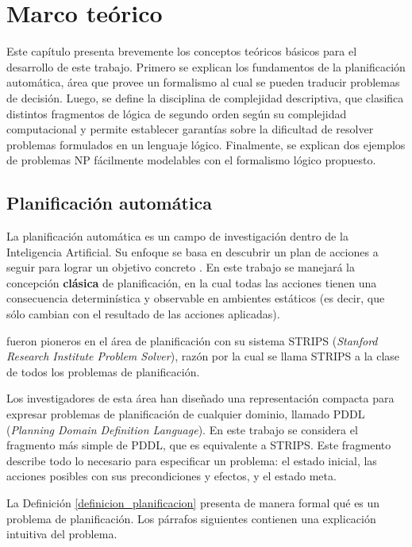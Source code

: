 
\chapter{Marco teórico}
\label{Chapter1}

Este capítulo presenta brevemente los conceptos teóricos básicos para el
desarrollo de este trabajo. Primero se explican los fundamentos de la
planificación automática, área que provee un formalismo al cual se pueden
traducir problemas de decisión. Luego, se define la disciplina de complejidad
descriptiva, que clasifica distintos fragmentos de lógica de segundo orden
según su complejidad computacional y permite establecer garantías sobre la
dificultad de resolver problemas formulados en un lenguaje lógico.
Finalmente, se explican dos ejemplos de problemas NP fácilmente modelables
con el formalismo lógico propuesto.

\section{Planificación automática}
La planificación automática es un campo de investigación dentro de la Inteligencia
Artificial. Su enfoque se basa en descubrir un plan de acciones a seguir para
lograr un objetivo concreto \citep{russell:book}. En este trabajo se manejará
la concepción \textbf{clásica} de planificación, en la cual todas las acciones
tienen una consecuencia determinística y observable en ambientes estáticos (es
decir, que sólo cambian con el resultado de las acciones aplicadas).

\cite{fikes:strips} fueron pioneros en el área de planificación con su sistema
STRIPS (\textit{Stanford Research
Institute Problem Solver}), razón por la cual se llama STRIPS a la clase de
todos los problemas de planificación.

Los investigadores de esta área han diseñado una representación compacta para
expresar problemas de planificación de cualquier dominio, llamado PDDL
(\textit{Planning Domain Definition Language}).
En este trabajo se considera el fragmento más simple de PDDL, que es
equivalente a STRIPS.
Este fragmento describe todo lo necesario
para especificar un problema: el estado inicial, las acciones posibles con sus
precondiciones y efectos, y el estado meta.

La Definición \ref{definicion_planificacion} presenta de manera formal qué es
un problema de planificación. Los párrafos siguientes contienen una explicación
intuitiva del problema.

